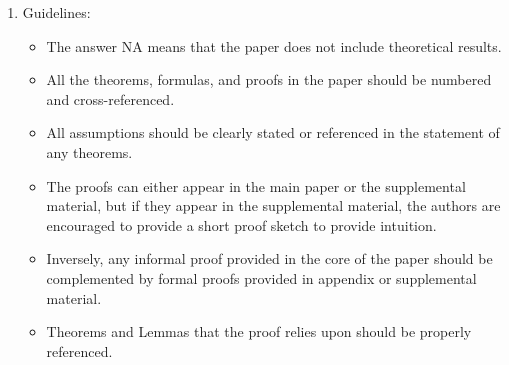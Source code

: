 \documentclass{article}
\theoremstyle{plain}
\theoremstyle{definition}
\theoremstyle{remark}
\begin{document}
\begin{enumerate}
    \item[] Guidelines:
    \begin{itemize}
        \item The answer NA means that the paper does not include theoretical results. 
        \item All the theorems, formulas, and proofs in the paper should be numbered and cross-referenced.
        \item All assumptions should be clearly stated or referenced in the statement of any theorems.
        \item The proofs can either appear in the main paper or the supplemental material, but if they appear in the supplemental material, the authors are encouraged to provide a short proof sketch to provide intuition. 
        \item Inversely, any informal proof provided in the core of the paper should be complemented by formal proofs provided in appendix or supplemental material.
        \item Theorems and Lemmas that the proof relies upon should be properly referenced. 
    \end{itemize}


\end{enumerate}
\end{document}
